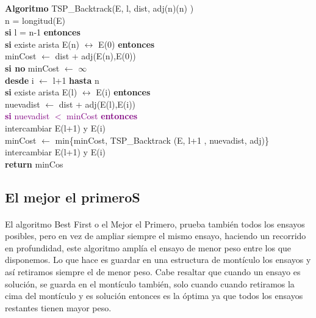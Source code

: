 \documentclass[es]{ifirak}
\begin{document}
{	\textbf{Algoritmo} TSP\_Backtrack(E, l, dist, adj(n)(n) )\\
	\hspace*{0.8cm}	 n = longitud(E) \\	
	\hspace*{0.8cm}	\textbf{si} l = n-1 \textbf{entonces}\\ 
	\hspace*{0.4cm}\hspace*{2cm}	\textbf{si} existe arista E(n) $\leftrightarrow$ E(0) \textbf{entonces}\\
	\hspace*{0.4cm}\hspace*{2.6cm}	 minCost $\leftarrow$ dist + adj(E(n),E(0)) \\
	\hspace*{0.8cm}	\textbf{si no} minCost $\leftarrow$ $ \infty$\\
	\hspace*{0.4cm}\hspace*{2cm}	\textbf{desde} i $\leftarrow$ l+1 \textbf{hasta} n\\ 
	\hspace*{0.4cm}\hspace*{2cm}	\textbf{si} existe arista E(l) $\leftrightarrow$ E(i) \textbf{entonces}\\
	\hspace*{3cm}	nuevadist $\leftarrow$ dist + adj(E(l),E(i))\\
	\hspace*{3cm} \textcolor{purple}{\textbf{si} nuevadist $<$ minCost \textbf{entonces}}\\
	\hspace*{3.6cm}	intercambiar E(l+1) y E(i)\\
	\hspace*{3.6cm}	minCost  $\leftarrow$ min\{minCost,  TSP\_Backtrack (E, l+1 , nuevadist, adj)\}\\
	\hspace*{3.6cm}	intercambiar E(l+1) y E(i)\\
	\hspace*{0.8cm}	\textbf{return} minCos\\
	
	\pagebreak
	\subsection{El mejor el primeroS}
	\paragraph{}
	El algoritmo Best First o el Mejor el Primero, prueba también todos los ensayos posibles, pero en vez de ampliar siempre el mismo ensayo, haciendo un recorrido en profundidad, este algoritmo amplía el ensayo de menor peso entre los que disponemos. Lo que hace es guardar en una estructura de montículo los ensayos y así retiramos siempre el de menor peso. Cabe resaltar que cuando un ensayo es solución, se guarda en el montículo también, solo cuando cuando retiramos la cima del montículo y es solución entonces es la óptima ya que todos los ensayos restantes tienen mayor peso.\\
	
}
\end{document}
